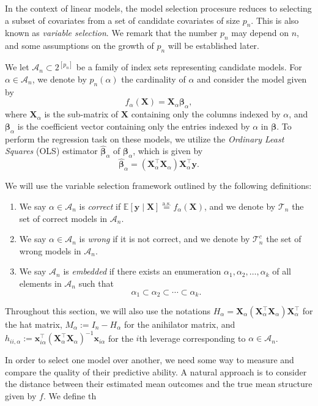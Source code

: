 \documentclass[11pt, letter paper]{article}
\newcommand{\1}{\mathmybb{1}}
\newcommand{\0}{\emptyset}
\newcommand{\Ep}[1]{\mathbb{E}\left[ #1 \right]}
\newcommand{\paren}[1]{\left(#1 \right)}
\newcommand{\Acal}{\mathcal{A}_{n}}
\newcommand{\Tcal}{\mathcal{T}_{n}}
\newcommand{\aseq}{\stackrel{\mathrm{a.s.}}{=}}
\newcommand{\X}{\boldsymbol{X}}
\newcommand{\x}{\boldsymbol{x}}
\newcommand{\y}{\boldsymbol{y}}
\newcommand{\bbeta}{\boldsymbol{\beta}}
\newcommand{\bbetahat}{\boldsymbol{\hat{\beta}}}
\newcommand{\ols}[1]{\paren{\X^{\top}_{#1}\X_{#1}}\X^{\top}_{#1}\y}
\begin{document}
In the context of linear models, the model selection procesure reduces to selecting a subset of covariates from a set of candidate covariates of size \(p_n\). This is also known as \emph{variable selection}. We remark that the number \(p_n\) may depend on \(n\), and some assumptions on the growth of \(p_n\) will be established later.

We let \(\Acal\subset2^{[p_{n}]}\) be a family of index sets representing candidate models. For \(\alpha\in\Acal\), we denote by \(p_{n}(\alpha)\) the cardinality of \(\alpha\) and consider the model given by
\[f_{\alpha}(\X) = \X_{\alpha}\bbeta_{\alpha},\]
where \(\X_{\alpha}\) is the sub-matrix of \(\X\) containing only the columns indexed by \(\alpha\), and \(\bbeta_{\alpha}\) is the coefficient vector containing only the entries indexed by \(\alpha\) in \(\bbeta\). To perform the regression task on these models, we utilize the \emph{Ordinary Least Squares} (OLS) estimator \(\bbetahat_{\alpha}\) of \(\bbeta_{\alpha}\), which is given by
\[\bbetahat_{\alpha} = \ols{\alpha}.\]

We will use the variable selection framework outlined by the following definitions:

\begin{enumerate}
    \item We say \(\alpha\in\Acal\) is \emph{correct} if \(\Ep{\y\mid\X}\aseq f_{\alpha}(\X)\), and we denote by \(\Tcal\) the set of correct models in \(\Acal\).
    \item We say \(\alpha\in\Acal\) is \emph{wrong} if it is not correct, and we denote by \(\Tcal^{c}\) the set of wrong models in \(\Acal\).
    \item We say \(\Acal\) is \emph{embedded} if there exists an enumeration \(\alpha_{1}, \alpha_{2}, \ldots, \alpha_{k}\) of all elements in \(\Acal\) such that \[\alpha_{1}\subset\alpha_{2}\subset\cdots\subset\alpha_{k}.\]
\end{enumerate}

Throughout this section, we will also use the notations \(H_{\alpha} = \X_{\alpha}\paren{\X_{\alpha}^{\top}\X_{\alpha}}\X_{\alpha}^{\top}\) for the hat matrix, \(M_{\alpha}:=I_{n}-H_{\alpha}\) for the anihilator matrix, and \(h_{ii,\alpha}:=\x_{i\alpha}^{\top}{(\X_{\alpha}^{\top}\X_{\alpha})}^{-1}\x_{i\alpha}\) for the \(i\)th leverage corresponding to \(\alpha\in\Acal\).

In order to select one model over another, we need some way to measure and compare the quality of their predictive ability. A natural approach is to consider the distance between their estimated mean outcomes and the true mean structure given by \(f\). We define th
\end{document}
